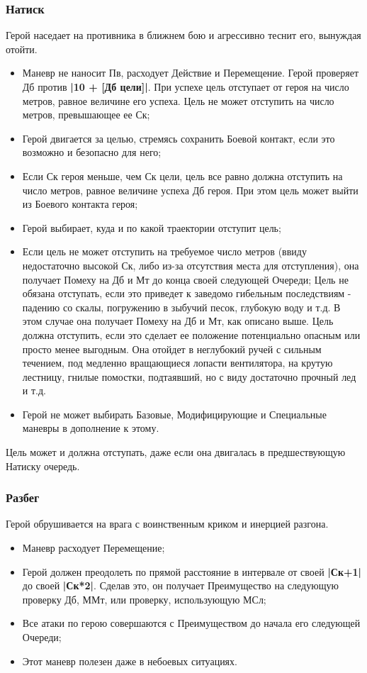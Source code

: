 \subsubsection{Натиск}
Герой наседает на противника в ближнем бою и агрессивно теснит его, вынуждая отойти.
\begin{itemize}
  \item Маневр не наносит Пв, расходует Действие и Перемещение. Герой проверяет Дб против \textbf{|10 + [Дб цели]|}. При успехе цель отступает от героя на число метров, равное величине его успеха. Цель не может отступить на число метров, превышающее ее Ск;
  \item Герой двигается за целью, стремясь сохранить Боевой контакт, если это возможно и безопасно для него;
  \item Если Ск героя меньше, чем Ск цели, цель все равно должна отступить на число метров, равное величине успеха Дб героя. При этом цель может выйти из Боевого контакта героя;
  \item Герой выбирает, куда и по какой траектории отступит цель;
  \item Если цель не может отступить на требуемое число метров (ввиду недостаточно высокой Ск, либо из-за отсутствия места для отступления), она получает Помеху на Дб и Мт до конца своей следующей Очереди;
    \newline Цель не обязана отступать, если это приведет к заведомо гибельным последствиям - падению со скалы, погружению в зыбучий песок, глубокую воду и т.д. В этом случае она получает Помеху на Дб и Мт, как описано выше. Цель должна отступить, если это сделает ее положение потенциально опасным или просто менее выгодным. Она отойдет в неглубокий ручей с сильным течением, под медленно вращающиеся лопасти вентилятора, на крутую лестницу, гнилые помостки, подтаявший, но с виду достаточно прочный лед и т.д.
  \item Герой не может выбирать Базовые, Модифицирующие и Специальные  маневры в дополнение к этому.
\end{itemize}
\begin{tcolorbox}
  Цель может и должна отступать, даже если она двигалась в предшествующую Натиску очередь. 
\end{tcolorbox}

\subsubsection{Разбег}
Герой обрушивается на врага с воинственным криком и инерцией разгона.

\begin{itemize}
  \item Маневр расходует Перемещение;
  \item Герой должен преодолеть по прямой расстояние в интервале от своей \textbf{|Ск+1|} до своей \textbf{|Ск*2|}. Сделав это, он получает Преимущество на следующую проверку Дб, ММт, или проверку, использующую МСл;
  \item Все атаки по герою совершаются с Преимуществом до начала его следующей Очереди;
  \item Этот маневр полезен даже в небоевых ситуациях.
\end{itemize}
